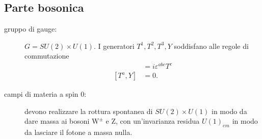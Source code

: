 \documentclass[italian,a4paper]{article}
\theoremstyle{definition}
\begin{document}
\subsection{Parte bosonica}
\begin{description}
    \item[gruppo di gauge:]
$G = SU(2) \times U(1)$. I generatori $T^1,T^2, T^3, Y$ soddisfano alle regole di commutazione
\begin{align*}
    [T^a, T^b] &= i \varepsilon^{abc}T^c\\
    [T^a, Y] &= 0.
\end{align*}
\item[campi di materia a spin $0$:] devono realizzare la rottura spontanea
    di $SU(2)\times U(1)$ in modo da dare massa ai bosoni $\mathrm{W^{\pm}}$ e
    $\mathrm{Z}$, con un'invarianza residua $U(1)_{em}$ in modo da lasciare
    il fotone a massa nulla.


\end{description}
\end{document}
